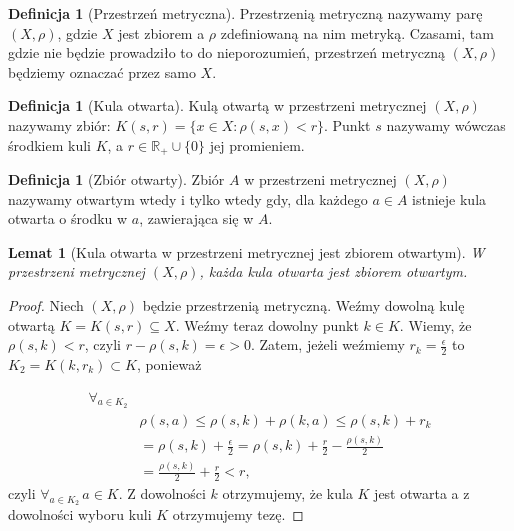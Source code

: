 \documentclass[licencjacka]{pwr_wmat_praca_dyplomowa}
\theoremstyle{plain}
\numberwithin{theorem}{chapter}
\newtheorem{lemma}[theorem]{Lemat}
\theoremstyle{definition}
\numberwithin{theorem}{chapter}
\newtheorem{definition}[theorem]{Definicja}
\begin{document}
\begin{definition}[Przestrzeń metryczna]
Przestrzenią metryczną nazywamy parę $(X, \rho)$, gdzie $X$ jest zbiorem a $\rho$ zdefiniowaną na nim metryką. Czasami, tam gdzie nie będzie prowadziło to do nieporozumień, przestrzeń metryczną $(X, \rho)$ będziemy oznaczać przez samo $X$.
\end{definition}

\begin{definition}[Kula otwarta]
Kulą otwartą w przestrzeni metrycznej $(X, \rho)$ nazywamy zbiór: $K(s, r) = \{x \in X: \rho(s, x) < r\}$.
Punkt $s$ nazywamy wówczas środkiem kuli $K$, a $r \in \mathbb{R}_+ \cup \{0\}$ jej promieniem.
\end{definition}

\begin{definition}[Zbiór otwarty]
Zbiór $A$ w przestrzeni metrycznej $(X, \rho)$ nazywamy otwartym wtedy i tylko wtedy gdy, dla każdego $a \in A$ istnieje kula otwarta o środku w $a$, zawierająca się w $A$.
\end{definition}

\begin{lemma}[Kula otwarta w przestrzeni metrycznej jest zbiorem otwartym]\label{kula_otwarta_jest_zbiorem_otwartym}
W przestrzeni metrycznej $(X, \rho)$, każda kula otwarta jest zbiorem otwartym.
\end{lemma}

\begin{proof}
Niech $(X, \rho)$ będzie przestrzenią metryczną. Weźmy dowolną kulę otwartą $K = K(s, r) \subseteq X$. Weźmy teraz dowolny punkt $k \in K$. Wiemy, że $\rho(s, k) < r$, czyli $r - \rho(s, k) = \epsilon > 0$. Zatem, jeżeli weźmiemy $r_k = \frac{\epsilon}{2}$ to $K_2 = K(k, r_k) \subset K$, ponieważ 

\begin{equation}
\begin{aligned}
\forall_{a \in K_2} \\
& \rho(s, a) \leq \rho(s, k) + \rho(k, a) \leq \rho(s, k) + r_k \\
& = \rho(s, k) + \frac{\epsilon}{2} = \rho(s, k) + \frac{r}{2} - \frac{\rho(s, k)}{2} \\
& = \frac{\rho(s, k)}{2} + \frac{r}{2} < r,
\end{aligned}
\end{equation}
czyli $\forall_{a \in K_2} \, a \in K.$ Z dowolności $k$ otrzymujemy, że kula $K$ jest otwarta a z dowolności wyboru kuli $K$ otrzymujemy tezę.
\end{proof}
\end{document}
